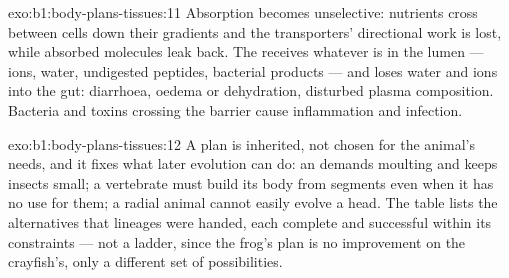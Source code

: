 \begin{solution}{exo:b1:body-plans-tissues:11}
Absorption becomes unselective: nutrients cross between cells down
their gradients and the transporters' directional work is lost, while
absorbed molecules leak back. The  receives whatever
is in the lumen --- ions, water, undigested peptides, bacterial
products --- and loses water and ions into the gut: diarrhoea, oedema
or dehydration, disturbed plasma composition. Bacteria and toxins
crossing the barrier cause inflammation and infection.
\end{solution}

\begin{solution}{exo:b1:body-plans-tissues:12}
A plan is inherited, not chosen for the animal's needs, and it fixes
what later evolution can do: an  demands moulting and keeps
insects small; a vertebrate must build its body from segments even when
it has no use for them; a radial animal cannot easily evolve a head.
The table lists the alternatives that lineages were handed, each
complete and successful within its constraints --- not a ladder, since
the frog's plan is no improvement on the crayfish's, only a different
set of possibilities.
\end{solution}

